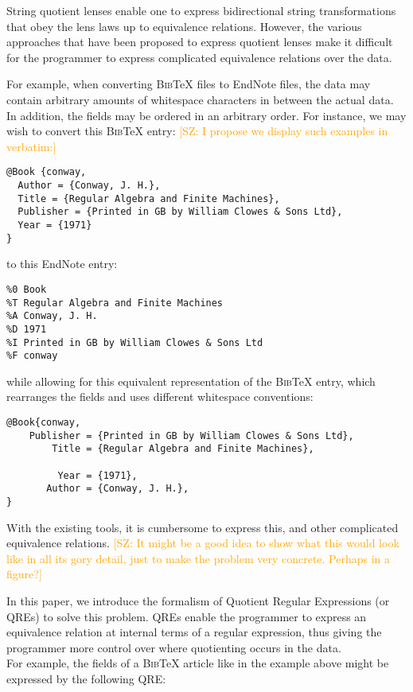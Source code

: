 \documentclass{svproc}
\newcommand{\FINISH}[3]{\ifdraft\textcolor{#1}{[#2: #3]}\fi}
\newcommand{\saz}[1]{\FINISH{orange}{SZ}{#1}}
\begin{document}
String quotient lenses enable one to express bidirectional string
transformations that obey the lens laws up to equivalence relations. However,
the various approaches that have been proposed to express quotient lenses
make it difficult for the programmer to express complicated equivalence
relations over the data.

For example, when converting \textsc{Bib}\TeX{} files to EndNote files, the data
may contain arbitrary amounts of whitespace characters in between the actual
data. In addition, the fields may be ordered in an arbitrary order. For
instance, we may wish to convert this \textsc{Bib}\TeX{} entry: \saz{I propose
  we display such examples in verbatim:}

\begin{verbatim}
@Book {conway,
  Author = {Conway, J. H.},
  Title = {Regular Algebra and Finite Machines},
  Publisher = {Printed in GB by William Clowes & Sons Ltd},
  Year = {1971}
}
\end{verbatim}

to this EndNote entry:


\begin{verbatim}
%0 Book
%T Regular Algebra and Finite Machines
%A Conway, J. H.
%D 1971
%I Printed in GB by William Clowes & Sons Ltd
%F conway
\end{verbatim}

\noindent while allowing for this equivalent representation of the \textsc{Bib}\TeX{}
entry, which rearranges the fields and uses different  whitespace conventions:

\begin{verbatim}
@Book{conway, 
    Publisher = {Printed in GB by William Clowes & Sons Ltd},
        Title = {Regular Algebra and Finite Machines},

         Year = {1971},
       Author = {Conway, J. H.},
}
\end{verbatim}

With the existing tools, it is cumbersome to express this, and other complicated
equivalence relations.  \saz{It might be a good idea to show what this would
  look like in all its gory detail, just to make the problem very
  concrete. Perhaps in a figure?}


In this paper, we introduce the formalism of Quotient Regular Expressions (or
QREs) to solve this problem. QREs enable the programmer to express an
equivalence relation at internal terms of a regular expression, thus giving
the programmer more control over where quotienting occurs in the data.\\
For example, the fields of a \textsc{Bib}\TeX{} article like in the example
above might be expressed by the following QRE:
\end{document}
